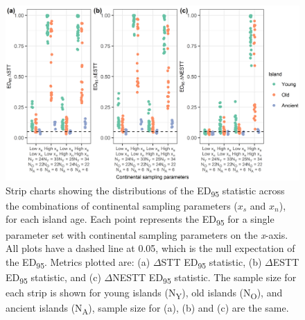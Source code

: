 \documentclass{article}
\begin{document}
\begin{figure}
    \centering
    \includegraphics[width=\textwidth]{nonoceanic_sampling_parameters.png}
    \caption{Strip charts showing the distributions of the ED\textsubscript{95} statistic across the combinations of continental sampling parameters ($x_s$ and $x_n$), for each island age. Each point represents the ED\textsubscript{95} for a single parameter set with continental sampling parameters on the \textit{x}-axis. All plots have a dashed line at 0.05, which is the null expectation of the ED\textsubscript{95}. Metrics plotted are: (a) $\Delta$STT ED\textsubscript{95} statistic, (b) $\Delta$ESTT ED\textsubscript{95} statistic, and (c) $\Delta$NESTT ED\textsubscript{95} statistic. The sample size for each strip is shown for young islands (N\textsubscript{Y}), old islands (N\textsubscript{O}), and ancient islands (N\textsubscript{A}), sample size for (a), (b) and (c) are the same.}
    \label{fig:nonoceanic_sampling_parameters}
\end{figure}

\clearpage
\end{document}
